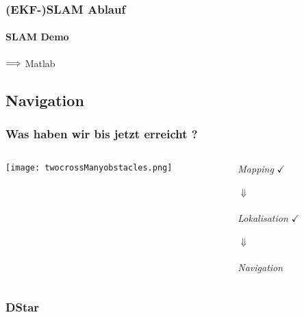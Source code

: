 \documentclass{beamer}
\begin{document}
\begin{frame}
\frametitle{(EKF-)SLAM Ablauf}
\framesubtitle{SLAM Demo}
\begin{center}
${\Huge \Longrightarrow}$ {\Large Matlab}
\end{center}
\end{frame}


\subsection{Navigation}

\begin{frame}
\frametitle{Was haben wir bis jetzt erreicht ?}

\begin{columns}[T]
\begin{column}[T]{5cm}
\begin{center}
\texttt{[image: twocrossManyobstacles.png]}
\end{center}

\end{column}

\begin{column}[T]{5cm}
\begin{center}
{ \textit{Mapping}} \pause $\checkmark$ \\ 
\quad \\
\pause
	{\large$\Downarrow$}\\
\quad \\
{ \textit{Lokalisation}}  \pause $\checkmark$  \\
\quad \\
\pause
	{\large$\Downarrow$}\\
\quad \\
{ \textit{Navigation}}\\
\end{center}
\end{column}
\end{columns}

\end{frame}




\subsubsection{DStar}
\end{document}
